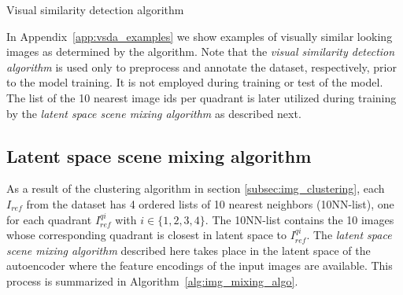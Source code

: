 \documentclass[12pt,a4paper]{article}
\begin{document}
\begin{algorithm}[H]
\DontPrintSemicolon
\LinesNumbered
{}
\caption{Visual similarity detection algorithm}\label{alg:vis_sim_det_algo}
\end{algorithm}

In Appendix~\ref{app:vsda_examples} we show examples of visually similar looking images as determined by the algorithm. Note that the \textit{visual similarity detection algorithm} is used only to preprocess and annotate the dataset, respectively, prior to the model training. It is not employed during training or test of the model. The list of the 10 nearest image ids per quadrant is later utilized during training by the \textit{latent space scene mixing algorithm} as described next.


\subsection{Latent space scene mixing algorithm} \label{subsec:img_mixing_algo}
As a result of the clustering algorithm in section \ref{subsec:img_clustering}, each $I_{ref}$ from the dataset has 4 ordered lists of 10 nearest neighbors (10NN-list), one for each quadrant $I^{qi}_{ref}$ with $i \in \{1,2,3,4\}$. The 10NN-list contains the 10 images whose corresponding quadrant is closest in latent space to $I^{qi}_{ref}$. The \textit{latent space scene mixing algorithm} described here takes place in the latent space of the autoencoder where the feature encodings of the input images are available. This process is summarized in Algorithm~\ref{alg:img_mixing_algo}. 
\end{document}
